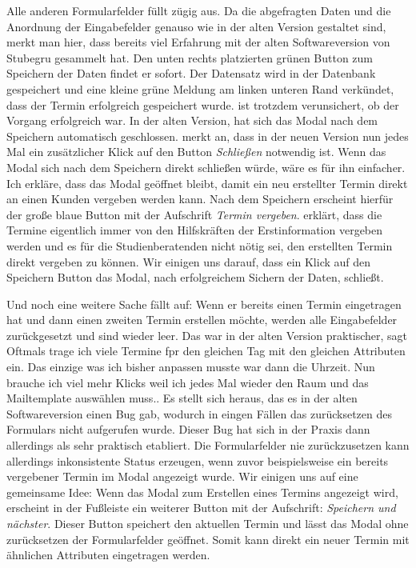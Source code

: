 Alle anderen Formularfelder füllt \ipName zügig aus. Da die abgefragten Daten
und die Anordnung der Eingabefelder genauso wie in der alten Version gestaltet
sind, merkt man hier, dass \ipName bereits viel Erfahrung mit der alten
Softwareversion von Stubegru gesammelt hat. Den unten rechts platzierten grünen
Button zum Speichern der Daten findet er sofort. Der Datensatz wird in der
Datenbank gespeichert und eine kleine grüne Meldung am linken unteren Rand
verkündet, dass der Termin erfolgreich gespeichert wurde. \ipName ist trotzdem
verunsichert, ob der Vorgang erfolgreich war. In der alten Version, hat sich
das Modal nach dem Speichern automatisch geschlossen. \ipName merkt an, dass in
der neuen Version nun jedes Mal ein zusätzlicher Klick auf den Button
\textit{Schließen} notwendig ist. Wenn das Modal sich nach dem Speichern direkt
schließen würde, wäre es für ihn einfacher. Ich erkläre, dass das Modal
geöffnet bleibt, damit ein neu erstellter Termin direkt an einen Kunden
vergeben werden kann. Nach dem Speichern erscheint hierfür der große blaue
Button mit der Aufschrift \textit{Termin vergeben}. \ipName erklärt, dass die
Termine eigentlich immer von den Hilfskräften der Erstinformation vergeben
werden und es für die Studienberatenden nicht nötig sei, den erstellten Termin
direkt vergeben zu können. Wir einigen uns darauf, dass ein Klick auf den
Speichern Button das Modal, nach erfolgreichem Sichern der Daten, schließt.

Und noch eine weitere Sache fällt \ipName auf: Wenn er bereits einen Termin
eingetragen hat und dann einen zweiten Termin erstellen möchte, werden alle
Eingabefelder zurückgesetzt und sind wieder leer. \glqq{}Das war in der alten
Version praktischer\grqq{}, sagt \ipName \glqq{}Oftmals trage ich viele Termine
fpr den gleichen Tag mit den gleichen Attributen ein. Das einzige was ich
bisher anpassen musste war dann die Uhrzeit. Nun brauche ich viel mehr Klicks
weil ich jedes Mal wieder den Raum und das Mailtemplate auswählen muss.\grqq{}.
Es stellt sich heraus, das es in der alten Softwareversion einen Bug gab,
wodurch in eingen Fällen das zurücksetzen des Formulars nicht aufgerufen wurde.
Dieser Bug hat sich in der Praxis dann allerdings als sehr praktisch etabliert.
Die Formularfelder nie zurückzusetzen kann allerdings inkonsistente Status
erzeugen, wenn zuvor beispielsweise ein bereits vergebener Termin im Modal
angezeigt wurde. Wir einigen uns auf eine gemeinsame Idee: Wenn das Modal zum
Erstellen eines Termins angezeigt wird, erscheint in der Fußleiste ein weiterer
Button mit der Aufschrift: \textit{Speichern und nächster}. Dieser Button
speichert den aktuellen Termin und lässt das Modal ohne zurücksetzen der
Formularfelder geöffnet. Somit kann direkt ein neuer Termin mit ähnlichen
Attributen eingetragen werden. 

